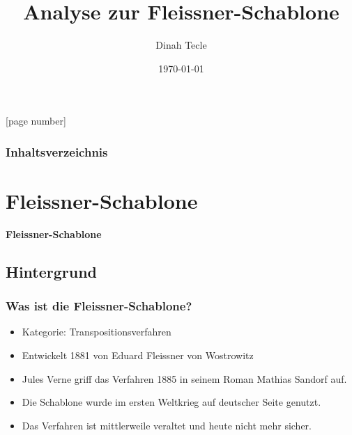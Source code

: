 \documentclass{beamer}
\begin{document}
\title{Analyse zur Fleissner-Schablone}  
\author{Dinah Tecle}
\date{\today} 

[page number]
\begin{frame}
\titlepage
\end{frame} 

\begin{frame}
\frametitle{Inhaltsverzeichnis}\tableofcontents
\end{frame} 


\section{Fleissner-Schablone} 
\begin{frame}
\begin{center}
\textbf{\huge Fleissner-Schablone}
\end{center}
\end{frame}

\subsection{Hintergrund}
\begin{frame}
\frametitle{Was ist die Fleissner-Schablone?} 
\begin{itemize}
\item Kategorie: Transpositionsverfahren
\item Entwickelt 1881 von Eduard Fleissner von Wostrowitz
\item Jules Verne griff das Verfahren 1885 in seinem Roman \glqq Mathias Sandorf\grqq{} auf.
\item Die Schablone wurde im ersten Weltkrieg auf deutscher Seite genutzt.
\item Das Verfahren ist mittlerweile veraltet und heute nicht mehr sicher.
\end{itemize}
\end{frame}
\end{document}
